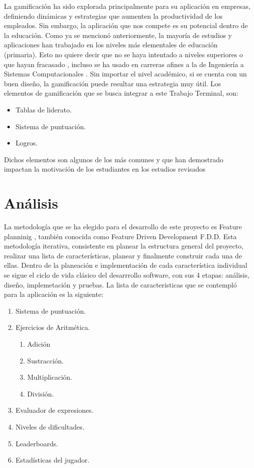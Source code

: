 \documentclass{article}
\begin{document}
La gamificación ha sido explorada principalmente para su aplicación en empresas, definiendo dinámicas y estrategias que aumenten la productividad de los empleados. Sin embargo, la aplicación que nos compete es su potencial dentro de la educación. Como ya se mencionó anteriormente, la mayoría de estudios y aplicaciones han trabajado en los niveles más elementales de educación (primaria)\cite{rodrigues2017math}. Esto no quiere decir que no se haya intentado a niveles superiores o que hayan fracasado \cite{wiggins2016overview,sanchez2017classcraft,tan2018}, incluso se ha usado
en carreras afines a la de Ingeniería a Sistemas Computacionales \cite{ibanez2014gamification}. Sin importar el nivel académico, si
se cuenta con un buen diseño, la gamificación puede resultar una estrategia muy útil. Los elementos de
gamificación que se busca integrar a este Trabajo Terminal, son:

\begin{itemize}
\item{Tablas de liderato.}
\item{Sistema de puntuación.}
\item{Logros.}
\end{itemize}

Dichos elementos son algunos de los más comunes y que han demostrado impactan la motivación de los
estudiantes en los estudios revisados  \cite{wiggins2016overview,sanchez2017classcraft,ibanez2014gamification,tan2018}
\pagebreak



\section{Análisis}

La metodología que se ha elegido para el desarrollo de este proyecto es Feature planninig 
\cite{hunt2006feature}, también conocida como Feature Driven 
Development F.D.D. Esta metodología iterativa, consistente en planear
la estructura general del proyecto, realizar una lista de características, planear  y finalmente 
construir cada una de ellas. Dentro de la planeación e implementación de cada característica individual se sigue el ciclo de vida clásico del desarrrollo software, con sus 4 etapas: análisis, diseño, implemetación y pruebas. 
La lista de caracteristicas que se contempló para la aplicación es la siguiente:
\begin{enumerate}
	\item Sistema de puntuación.
	\item Ejercicios de Aritmética.
	\begin{enumerate}
		\item Adición 
		\item Sustracción.
		\item Multiplicación.
		\item División.
	\end{enumerate}
	\item Evaluador de expresiones.
	\item Niveles de dificultades.
	\item Leaderboards.
	\item Estadísticas del jugador.
\end{enumerate}
\end{document}

